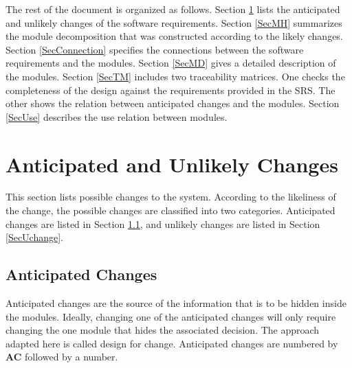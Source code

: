 \documentclass[12pt]{article}
\begin{document}
\noindent The rest of the document is organized as follows. Section
\ref{SecChange} lists the anticipated and unlikely changes of the software
requirements. Section \ref{SecMH} summarizes the module decomposition that
was constructed according to the likely changes. Section \ref{SecConnection}
specifies the connections between the software requirements and the
modules. Section \ref{SecMD} gives a detailed description of the
modules. Section \ref{SecTM} includes two traceability matrices. One checks
the completeness of the design against the requirements provided in the SRS. The
other shows the relation between anticipated changes and the modules. Section
\ref{SecUse} describes the use relation between modules.

\section{Anticipated and Unlikely Changes} \label{SecChange}

This section lists possible changes to the system. According to the likeliness
of the change, the possible changes are classified into two
categories. Anticipated changes are listed in Section \ref{SecAchange}, and
unlikely changes are listed in Section \ref{SecUchange}.

\subsection{Anticipated Changes} \label{SecAchange}

Anticipated changes are the source of the information that is to be hidden
inside the modules. Ideally, changing one of the anticipated changes will only
require changing the one module that hides the associated decision. The approach
adapted here is called design for
change. Anticipated changes are numbered by \textbf{AC} followed by a number.
\end{document}
